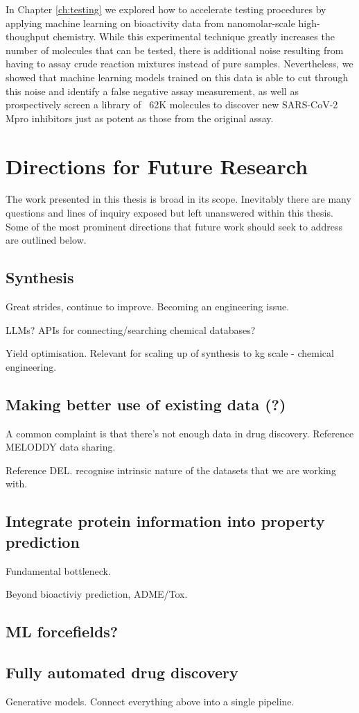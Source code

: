 In Chapter \ref{ch:testing} we explored how to accelerate testing procedures by applying machine learning on bioactivity data from nanomolar-scale high-thoughput chemistry. While this experimental technique greatly increases the number of molecules that can be tested, there is additional noise resulting from having to assay crude reaction mixtures instead of pure samples. Nevertheless, we showed that machine learning models trained on this data is able to cut through this noise and identify a false negative assay measurement, as well as prospectively screen a library of ~62K molecules to discover new SARS-CoV-2 Mpro inhibitors just as potent as those from the original assay.

\section{Directions for Future Research}

The work presented in this thesis is broad in its scope. Inevitably there are many questions and lines of inquiry exposed but left unanswered within this thesis. Some of the most prominent directions that future work should seek to address are outlined below.

\subsection{Synthesis}
Great strides, continue to improve. Becoming an engineering issue.

LLMs? APIs for connecting/searching chemical databases?

Yield optimisation. Relevant for scaling up of synthesis to kg scale - chemical engineering.

\subsection{Making better use of existing data (?)}

A common complaint is that there's not enough data in drug discovery. Reference MELODDY data sharing. 

Reference DEL. recognise intrinsic nature of the datasets that we are working with.

\subsection{Integrate protein information into property prediction}
Fundamental bottleneck.

Beyond bioactiviy prediction, ADME/Tox.

\subsection{ML forcefields?}

\subsection{Fully automated drug discovery}
Generative models. Connect everything above into a single pipeline. 
